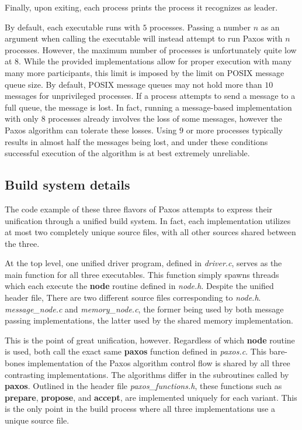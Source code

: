 \documentclass[12pt]{article}
\begin{document}
Finally, upon exiting, each process prints the process it recognizes as leader.

By default, each executable runs with $5$ processes. Passing a number $n$ as an argument
when calling the executable will instead attempt to run Paxos with $n$ processes. However,
the maximum number of processes is unfortunately quite low at $8$. While the provided
implementations allow for proper execution with many many more participants, this limit
is imposed by the limit on POSIX message queue size. By default, POSIX message queues
may not hold more than $10$ messages for unprivileged processes. If a process attempts
to send a message to a full queue, the message is lost. In fact, running a message-based
implementation with only $8$ processes already involves the loss of some messages, however
the Paxos algorithm can tolerate these losses. Using $9$ or more processes typically results
in almost half the messages being lost, and under these conditions successful execution of the
algorithm is at best extremely unreliable.

\subsection{Build system details}
The code example of these three flavors of Paxos attempts to express their unification
through a unified build system. In fact, each implementation utilizes at most two completely
unique source files, with all other sources shared between the three.

At the top level, one unified driver program, defined in \textit{driver.c}, serves as the
main function for all three executables. This function simply spawns threads which each
execute the \textbf{node} routine defined in \textit{node.h}. Despite the unified header file,
There are two different source files corresponding to \textit{node.h}. \textit{message\_node.c}
and \textit{memory\_node.c}, the former being used by both message passing implementations,
the latter used by the shared memory implementation.

This is the point of great unification, however. Regardless of which \textbf{node} routine
is used, both call the exact same \textbf{paxos} function defined in \textit{paxos.c}.
This bare-bones implementation of the Paxos algorithm control flow is shared by all three
contrasting implementations. The algorithms differ in the subroutines called by \textbf{paxos}.
Outlined in the header file \textit{paxos\_functions.h}, these functions such as \textbf{prepare},
\textbf{propose}, and \textbf{accept}, are implemented uniquely for each variant. This
is the only point in the build process where all three implementations use a unique source file.
\end{document}
